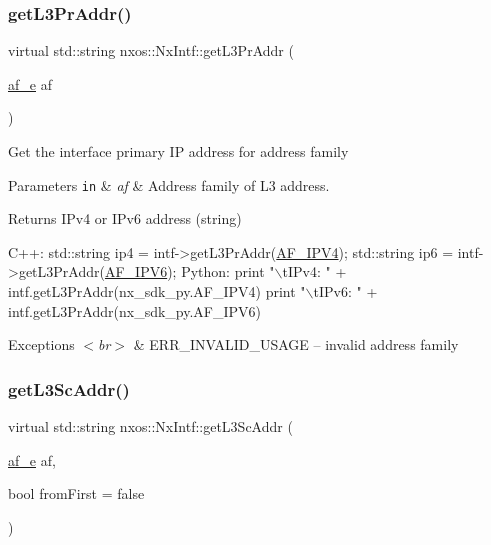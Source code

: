 \subsubsection{\texorpdfstring{get\+L3\+Pr\+Addr()}{getL3PrAddr()}}
{\footnotesize\ttfamily virtual std\+::string nxos\+::\+Nx\+Intf\+::get\+L3\+Pr\+Addr (\begin{DoxyParamCaption}\item[{\mbox{\hyperlink{namespacenxos_a3a667f48b94db10aa398940dc5bf72d7}{af\+\_\+e}}}]{af }\end{DoxyParamCaption})\hspace{0.3cm}{\ttfamily [pure virtual]}}

Get the interface primary IP address for address family 
\begin{DoxyParams}[1]{Parameters}
\mbox{\tt in}  & {\em af} & Address family of L3 address. \\
\hline
\end{DoxyParams}
\begin{DoxyReturn}{Returns}
I\+Pv4 or I\+Pv6 address (string)
\end{DoxyReturn}

\begin{DoxyCode}
C++:
        std::string ip4 = intf->getL3PrAddr(\mbox{\hyperlink{namespacenxos_a3a667f48b94db10aa398940dc5bf72d7a038f37de02a2c9ee1acbc4e184583628}{AF\_IPV4}});
        std::string ip6 = intf->getL3PrAddr(\mbox{\hyperlink{namespacenxos_a3a667f48b94db10aa398940dc5bf72d7a9460164d2a9edfe9a1b3f8dc616e8c00}{AF\_IPV6}});
Python:
        print \textcolor{stringliteral}{"\(\backslash\)tIPv4: "} + intf.getL3PrAddr(nx\_sdk\_py.AF\_IPV4)
        print \textcolor{stringliteral}{"\(\backslash\)tIPv6: "} + intf.getL3PrAddr(nx\_sdk\_py.AF\_IPV6)
\end{DoxyCode}



\begin{DoxyExceptions}{Exceptions}
{\em $<$br$>$} & E\+R\+R\+\_\+\+I\+N\+V\+A\+L\+I\+D\+\_\+\+U\+S\+A\+GE -- invalid address family \\
\hline
\end{DoxyExceptions}
\mbox{\label{classnxos_1_1_nx_intf_af0aebadac66f6b4fbe8ddbd567a577b6}} 
\subsubsection{\texorpdfstring{get\+L3\+Sc\+Addr()}{getL3ScAddr()}}
{\footnotesize\ttfamily virtual std\+::string nxos\+::\+Nx\+Intf\+::get\+L3\+Sc\+Addr (\begin{DoxyParamCaption}\item[{\mbox{\hyperlink{namespacenxos_a3a667f48b94db10aa398940dc5bf72d7}{af\+\_\+e}}}]{af,  }\item[{bool}]{from\+First = {\ttfamily false} }\end{DoxyParamCaption})\hspace{0.3cm}{\ttfamily [pure virtual]}}


